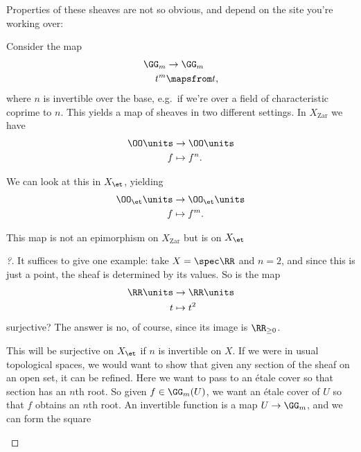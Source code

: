 Properties of these sheaves are not so obvious, and depend on the site
you're working over:

\begin{example}[?]

Consider the map
\begin{align*}  
\GG_m &\to \GG_m \\
t^m &\mapsfrom t
,\end{align*} where \(n\) is invertible over the base, e.g.~if we're
over a field of characteristic coprime to \(n\). This yields a map of
sheaves in two different settings. In \(X_{\mathrm{Zar}}\) we have
\begin{align*}  
\OO\units &\to \OO\units \\
f &\mapsto f^n
.\end{align*}

We can look at this in \(X_{\et}\), yielding
\begin{align*}  
\OO_\et\units &\to \OO_\et\units \\
f &\mapsto f^m
.\end{align*}

\begin{claim}

This map is not an epimorphism on \(X_{\mathrm{Zar}}\) but is on
\(X_{\et}\)

\end{claim}

\begin{proof}[?]

It suffices to give one example: take \(X = \spec \RR\) and \(n=2\), and
since this is just a point, the sheaf is determined by its values. So is
the map
\begin{align*}  
\RR\units &\to \RR\units \\
t &\mapsto t^2
\end{align*} surjective? The answer is no, of course, since its image is
\(\RR_{\geq 0}\).

This will be surjective on \(X_{\et}\) if \(n\) is invertible on \(X\).
If we were in usual topological spaces, we would want to show that given
any section of the sheaf on an open set, it can be refined. Here we want
to pass to an étale cover so that section has an \(n\)th root. So given
\(f\in \GG_m(U)\), we want an étale cover of \(U\) so that \(f\) obtains
an \(n\)th root. An invertible function is a map \(U\to \GG_m\), and we
can form the square

\begin{center}
\end{center}


\end{proof}
\end{example}
